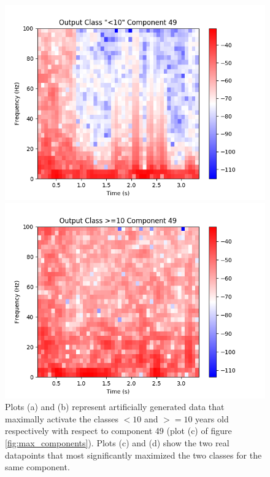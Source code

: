 \documentclass[fleqn,10pt]{wlscirep}
\begin{document}
\begin{figure}
\begin{minipage}{0.47\textwidth}
    \includegraphics[width=\linewidth]{max_act/real_0_49.png}
  \end{minipage}
  \hspace*{\fill} 
  \begin{minipage}{0.47\textwidth}
    \includegraphics[width=\linewidth]{max_act/real_1_49.png}
  \end{minipage}
  \caption{Plots (a) and (b) represent artificially generated data that maximally activate the classes $<10$ and $>=10$ years old respectively with respect to component 49 (plot (c) of figure \ref{fig:max_components}). Plots (c) and (d) show the two real datapoints that most significantly maximized the two classes for the same component.} \label{fig:component_49}
\end{figure}
\end{document}
